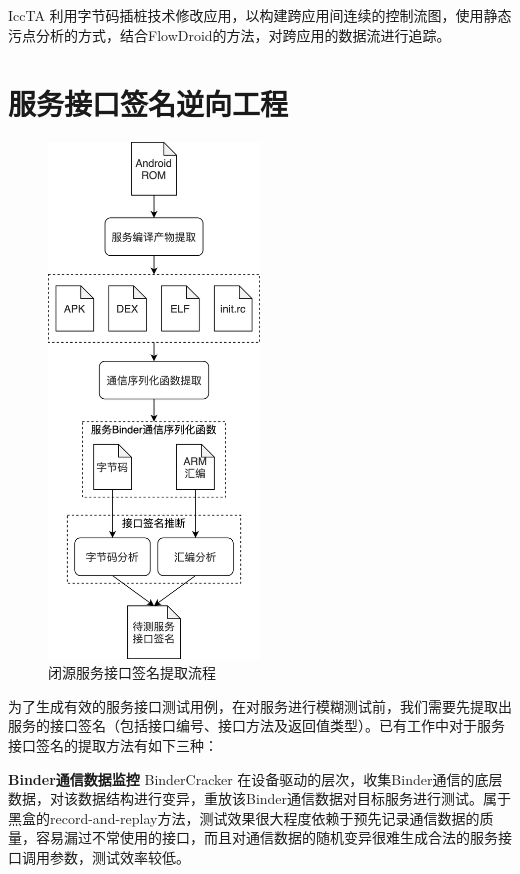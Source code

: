 \documentclass[winfonts,master,twoside]{njuthesis}
\begin{document}
IccTA \cite{li2015iccta}利用字节码插桩技术修改应用，以构建跨应用间连续的控制流图，使用静态污点分析的方式，结合FlowDroid的方法，对跨应用的数据流进行追踪。


\chapter{服务接口签名逆向工程}

\begin{figure}
	\centering
	\includegraphics[width=0.5\textwidth]{figure/3-extractor/workflow-simple.png}
	\caption{闭源服务接口签名提取流程}
	\label{extractor-workflow}
\end{figure}

为了生成有效的服务接口测试用例，在对服务进行模糊测试前，我们需要先提取出服务的接口签名（包括接口编号、接口方法及返回值类型）。已有工作中对于服务接口签名的提取方法有如下三种：

\textbf{Binder通信数据监控} \quad BinderCracker \cite{feng2016bindercracker}在设备驱动的层次，收集Binder通信的底层数据，对该数据结构进行变异，重放该Binder通信数据对目标服务进行测试。属于黑盒的record-and-replay方法，测试效果很大程度依赖于预先记录通信数据的质量，容易漏过不常使用的接口，而且对通信数据的随机变异很难生成合法的服务接口调用参数，测试效率较低。
\end{document}
